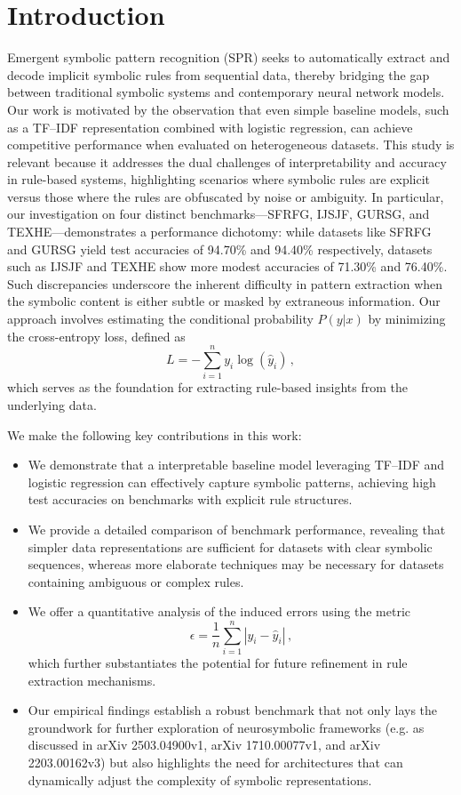 \documentclass{article}
\begin{document}
\section{Introduction}
Emergent symbolic pattern recognition (SPR) seeks to automatically extract and decode implicit symbolic rules from sequential data, thereby bridging the gap between traditional symbolic systems and contemporary neural network models. Our work is motivated by the observation that even simple baseline models, such as a TF–IDF representation combined with logistic regression, can achieve competitive performance when evaluated on heterogeneous datasets. This study is relevant because it addresses the dual challenges of interpretability and accuracy in rule-based systems, highlighting scenarios where symbolic rules are explicit versus those where the rules are obfuscated by noise or ambiguity. In particular, our investigation on four distinct benchmarks—SFRFG, IJSJF, GURSG, and TEXHE—demonstrates a performance dichotomy: while datasets like SFRFG and GURSG yield test accuracies of 94.70\% and 94.40\% respectively, datasets such as IJSJF and TEXHE show more modest accuracies of 71.30\% and 76.40\%. Such discrepancies underscore the inherent difficulty in pattern extraction when the symbolic content is either subtle or masked by extraneous information. Our approach involves estimating the conditional probability \(P(y|x)\) by minimizing the cross-entropy loss, defined as 
\[
L = -\sum_{i=1}^{n} y_i \log(\hat{y}_i)\,,
\]
which serves as the foundation for extracting rule-based insights from the underlying data.

We make the following key contributions in this work:
\begin{itemize}
    \item We demonstrate that a interpretable baseline model leveraging TF–IDF and logistic regression can effectively capture symbolic patterns, achieving high test accuracies on benchmarks with explicit rule structures.
    \item We provide a detailed comparison of benchmark performance, revealing that simpler data representations are sufficient for datasets with clear symbolic sequences, whereas more elaborate techniques may be necessary for datasets containing ambiguous or complex rules.
    \item We offer a quantitative analysis of the induced errors using the metric 
    \[
    \epsilon = \frac{1}{n}\sum_{i=1}^{n} \left|y_i - \hat{y}_i\right|\,, 
    \]
    which further substantiates the potential for future refinement in rule extraction mechanisms.
    \item Our empirical findings establish a robust benchmark that not only lays the groundwork for further exploration of neurosymbolic frameworks (e.g. as discussed in arXiv 2503.04900v1, arXiv 1710.00077v1, and arXiv 2203.00162v3) but also highlights the need for architectures that can dynamically adjust the complexity of symbolic representations.
\end{itemize}
\end{document}
